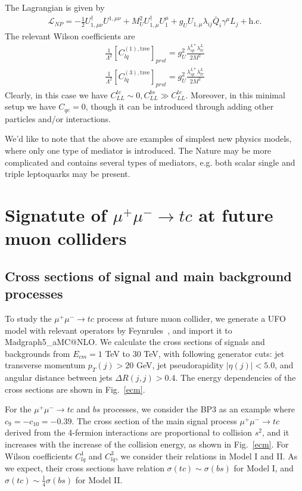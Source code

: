 \documentclass[a4paper,11pt]{article}
\makeatletter
\newcommand{\mgamc}{Madgraph5\_aMC@NLO}
\makeatother
\begin{document}
\begin{enumerate}
        The Lagrangian is given by 
        \begin{align}
        \mathcal{L}_{NP}=-\frac{1}{2}U_{1,\mu\nu}^{\dag}U^{1,\mu\nu}+M_U^2U_{1,\mu}^{\dag}U_1^{\mu}+g_UU_{1,\mu}\lambda_{ij}\bar{Q}_{i}\gamma^{\mu}L_{j}+\textrm{h.c.}
        \end{align}
        The relevant Wilson coefficients are
        \begin{align}
            \frac{1}{\Lambda^2}[C_{lq}^{(1),\textrm{tree}}]_{prst}=g_U^2\frac{\lambda_{sp}^{L*}\lambda_{tr}^{L}}{2M^2}\\
            \frac{1}{\Lambda^2}[C_{lq}^{(3),\textrm{tree}}]_{prst}=g_U^2\frac{\lambda_{sp}^{L*}\lambda_{tr}^{L}}{2M^2}
        \end{align}
        Clearly, in this case we have $C_{LL}^{tc}\sim0,C_{LL}^{bs}\gg C_{LL}^{tc}$. Moreover, in this minimal setup we have $C_{qe}=0$, though it can be introduced through adding other particles and/or interactions.
\end{enumerate}
We'd like to note that the above are examples of simplest new physics models, where only one type of mediator is introduced. The Nature may be more complicated and contains several types of mediators, e.g. both scalar single and triple leptoquarks may be present\cite{Crivellin:2017zlb}.

\section{Signatute of $\mu^+\mu^-\to tc$ at future muon colliders }
\label{Sec:result}

\subsection{Cross sections of signal and main background processes}
To study the $\mu^+\mu^-\to tc$ process at future muon collider, 
we generate a UFO model with relevant operators by Feynrules~\cite{Alloul:2013bka}, 
and import it to \mgamc \cite{Alwall:2014hca}. 
We calculate the cross sections of signals and backgrounds from $E_{cm}=1$ TeV to $30$ TeV, 
with following generator cuts: jet transverse momentum $p_T(j)>20$ GeV, jet pseudorapidity $|\eta(j)|<5.0$, and angular distance between jets $\Delta R(j,j)>0.4$.
The energy dependencies of the cross sections are shown in Fig.~\ref{ecm}. 

For the $\mu^+\mu^-\to tc$ and $bs$ processes, we consider the BP3 as an example where $c_{9}=-c_{10}=-0.39$. The cross section of the main signal process $\mu^+ \mu^- \to tc$ derived from the 4-fermion interactions are proportional to collision $s^2$, 
and it increases with the increase of the collision energy, as shown in Fig.~\ref{ecm}. 
For Wilson coefficients $C^{1}_{lq}$ and $C^{3}_{lq}$, we consider their relations in Model I and II. 
As we expect, their cross sections have relation $\sigma(tc)\sim \sigma(bs)$ for Model I, and $\sigma(tc)\sim\frac{1}{4}\sigma(bs)$ for Model II. 
\end{document}
